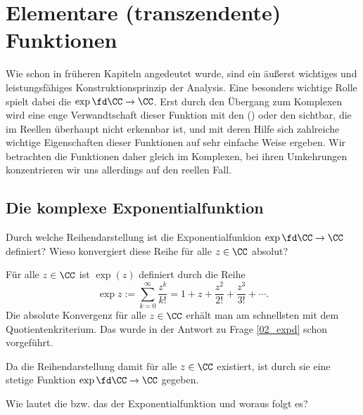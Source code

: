 \chapter{Elementare (transzendente) Funktionen}

Wie schon in früheren Kapiteln angedeutet wurde, sind 
 ein äußerst wichtiges und leistungsfähiges 
Konstruktionsprinzip der Analysis. Eine besonders wichtige Rolle 
spielt dabei die  
$\exp\fd \CC\to\CC$. Erst durch den Übergang zum Komplexen wird eine 
enge Verwandtschaft dieser Funktion 
mit den  
() oder den  
 sichtbar, die im Reellen 
überhaupt nicht erkennbar ist, und mit deren Hilfe sich zahlreiche 
wichtige Eigenschaften dieser Funktionen auf sehr einfache Weise ergeben. 
Wir betrachten die Funktionen daher gleich im Komplexen, bei ihren 
Umkehrungen konzentrieren wir uns allerdings auf den reellen Fall.

\section{Die komplexe Exponentialfunktion}

\begin{frage}\label{05_exei}\label{05_exko}
  Durch welche Reihendarstellung ist die Exponentialfunkion 
  $\exp \fd \CC\to\CC$ definiert? Wieso konvergiert diese Reihe 
  für alle $z\in\CC$ absolut?
\end{frage}

\begin{antwort}
  Für alle $z\in\CC$ ist $\exp (z)$ definiert durch die Reihe  
  \[
  \boxed{
    \exp z  := \sum_{k=0}^\infty \frac{z^k}{k!} = 
    1 + z + \frac{z^2}{2!} + \frac{z^3}{3!}+ \cdots . 
  }
  \]
  Die absolute Konvergenz für alle 
  $z\in\CC$ erhält man am schnellsten 
  mit dem Quotientenkriterium. Das wurde in der Antwort zu Frage 
  \ref{02_expd} schon vorgeführt.

  Da die Reihendarstellung 
  damit für alle $z\in\CC$ existiert, ist durch sie
  eine stetige Funktion $\exp\fd\CC\to\CC$ gegeben.
  \AntEnd
\end{antwort} 

\begin{frage}\label{05_exp_funktionalgleichung}
  Wie lautet die  bzw. 
  das  der Exponentialfunktion und 
  woraus folgt es?
\end{frage} 

